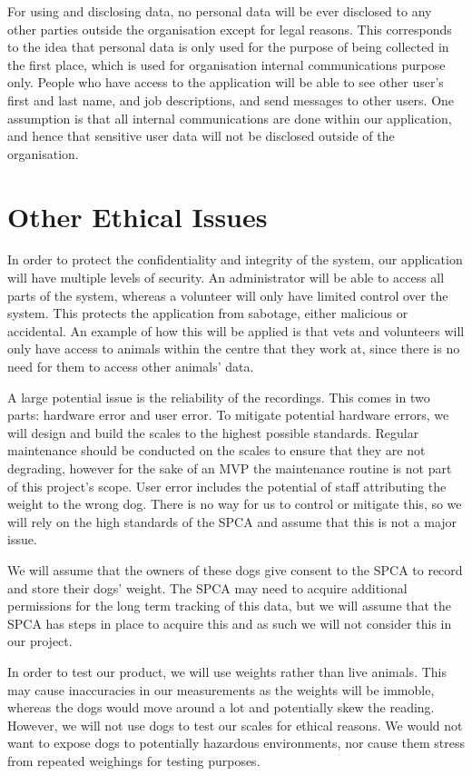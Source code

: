 For using and disclosing data, no personal data will be ever disclosed to any other parties outside the organisation except for legal reasons. This corresponds to the idea that personal data is only used for the purpose of being collected in the first place, which is used for organisation internal communications purpose only. People who have access to the application will be able to see other user's first and last name, and job descriptions, and send messages to other users. One assumption is that all internal communications are done within our application, and hence that sensitive user data will not be disclosed outside of the organisation.


\section{Other Ethical Issues}

In order to protect the confidentiality and integrity of the system, our application will have multiple levels of security. An administrator will be able to access all parts of the system, whereas a volunteer will only have limited control over the system. This protects the application from sabotage, either malicious or accidental. An example of how this will be applied is that vets and volunteers will only have access to animals within the centre that they work at, since there is no need for them to access other animals’ data. 

A large potential issue is the reliability of the recordings. This comes in two parts: hardware error and user error. To mitigate potential hardware errors, we will design and build the scales to the highest possible standards. Regular maintenance should be conducted on the scales to ensure that they are not degrading, however for the sake of an MVP the maintenance routine is not part of this project's scope. User error includes the potential of staff attributing the weight to the wrong dog. There is no way for us to control or mitigate this, so we will rely on the high standards of the SPCA and assume that this is not a major issue. 

We will assume that the owners of these dogs give consent to the SPCA to record and store their dogs’ weight. The SPCA may need to acquire additional permissions for the long term tracking of this data, but we will assume that the SPCA has steps in place to acquire this and as such we will not consider this in our project.

In order to test our product, we will use weights rather than live animals. This may cause inaccuracies in our measurements as the weights will be immoble, whereas the dogs would move around a lot and potentially skew the reading. However, we will not use dogs to test our scales for ethical reasons. We would not want to expose dogs to potentially hazardous environments, nor cause them stress from repeated weighings for testing purposes.



